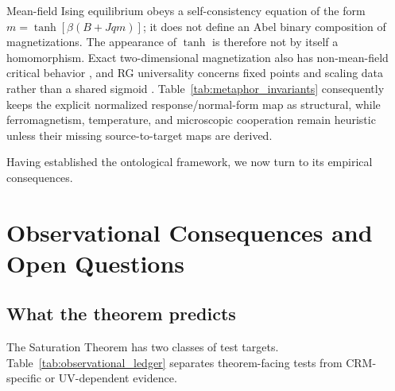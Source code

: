 \documentclass[aps,prd,twocolumn,superscriptaddress,nofootinbib]{revtex4-2}
\begin{document}
Mean-field Ising equilibrium obeys a self-consistency equation of the form $m=\tanh[\beta(B+Jqm)]$; it does not define an Abel binary composition of magnetizations. The appearance of $\tanh$ is therefore not by itself a homomorphism. Exact two-dimensional magnetization also has non-mean-field critical behavior \cite{Yang1952}, and RG universality concerns fixed points and scaling data rather than a shared sigmoid \cite{WilsonKogut1974}. Table~\ref{tab:metaphor_invariants} consequently keeps the explicit normalized response/normal-form map as structural, while ferromagnetism, temperature, and microscopic cooperation remain heuristic unless their missing source-to-target maps are derived.

Having established the ontological framework, we now turn to its empirical consequences.

\section{Observational Consequences and Open Questions}
\label{sec:observational}

\subsection{What the theorem predicts}

The Saturation Theorem has two classes of test targets. Table~\ref{tab:observational_ledger} separates theorem-facing tests from CRM-specific or UV-dependent evidence.
\end{document}
